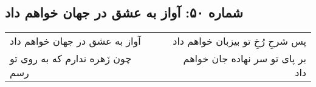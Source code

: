 \begin{center}
\section*{شماره ۵۰: آواز به عشق در جهان خواهم داد}
\label{sec:050}
\begin{longtable}{l p{0.5cm} r}
آواز به عشق در جهان خواهم داد
&&
پس شرحِ رُخِ تو بیزبان خواهم داد
\\
چون زَهره ندارم که به روی تو رسم
&&
بر پای تو سر نهاده جان خواهم داد
\\
\end{longtable}
\end{center}
